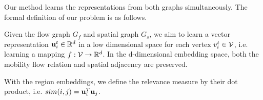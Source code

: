 Our method learns the representations from both graphs simultaneously. The formal definition of our problem is as follows.

\begin{definition}
Given the flow graph $G_f$ and spatial graph $G_s$, we aim to learn a vector representation $\mathbf{u}_i^t \in \mathbb{R}^d$ in a low dimensional space for each vertex $v_i^t \in \mathcal{V}$, i.e. learning a mapping $f: \mathcal{V} \rightarrow \mathbb{R}^d$. In the d-dimensional embedding space, both the mobility flow relation and spatial adjacency are preserved.
\end{definition}

With the region embeddings, we define the relevance measure by their dot product, i.e. $sim(i,j) = \mathbf{u}_i^T \mathbf{u}_j$.